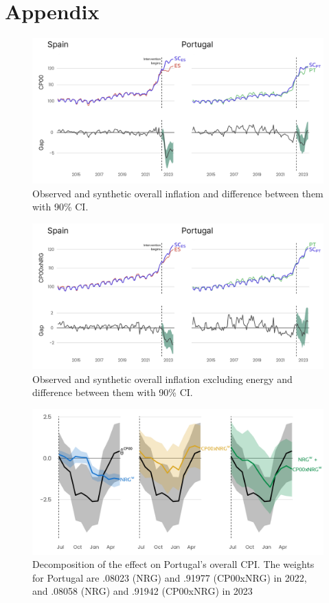 \documentclass[12pt,a4paper]{article}
\begin{document}
\section*{Appendix}\label{appendix}
\setcounter{figure}{0}
\renewcommand{\thefigure}{A\arabic{figure}}
\setcounter{table}{0}
\renewcommand{\thetable}{A\arabic{table}}
\vspace{.25cm}
\begin{figure}[!h]
    \centering 
    \includegraphics[width = .9\linewidth]{CP00_12_independent_y.png}
    \caption{Observed and synthetic overall inflation and difference between them with 90\% CI.}
    \label{fig:result_cp00}
\end{figure}
\vspace{2cm}
\begin{figure}[!h]
    \centering 
    \includegraphics[width = .9\linewidth]{CP00xNRG_12_independent_y.png}
    \caption{Observed and synthetic overall inflation excluding energy and difference between them with 90\% CI.}
    \label{fig:result_cp00xnrg}
\end{figure}
\vspace{2cm}
\begin{figure}[!t]
    \centering 
    \includegraphics[width = .9\linewidth]{HICP_weights_12_PT.png}
    \caption{Decomposition of the effect on Portugal’s overall CPI. The weights for Portugal are .08023 (NRG) and .91977 (CP00xNRG) in 2022, and .08058 (NRG) and .91942 (CP00xNRG) in 2023}
    \label{fig:weighted_cp00_pt}
\end{figure}
\end{document}
